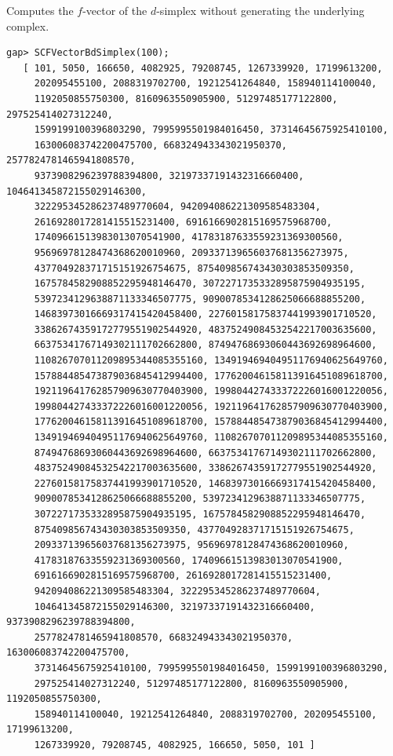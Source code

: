 \documentclass[a4paper,11pt]{report}
\begin{document}
{{{ Computes the $f$-vector of the $d$-simplex without generating the underlying complex. 
\begin{Verbatim}[commandchars=!@|,fontsize=\small,frame=single,label=Example]
   gap> SCFVectorBdSimplex(100);
   [ 101, 5050, 166650, 4082925, 79208745, 1267339920, 17199613200, 
     202095455100, 2088319702700, 19212541264840, 158940114100040, 
     1192050855750300, 8160963550905900, 51297485177122800, 297525414027312240, 
     1599199100396803290, 7995995501984016450, 37314645675925410100, 
     163006083742200475700, 668324943343021950370, 2577824781465941808570, 
     9373908296239788394800, 32197337191432316660400, 104641345872155029146300, 
     322295345286237489770604, 942094086221309585483304, 
     2616928017281415515231400, 6916166902815169575968700, 
     17409661513983013070541900, 41783187633559231369300560, 
     95696978128474368620010960, 209337139656037681356273975, 
     437704928371715151926754675, 875409856743430303853509350, 
     1675784582908852295948146470, 3072271735332895875904935195, 
     5397234129638871133346507775, 9090078534128625066688855200, 
     14683973016669317415420458400, 22760158175837441993901710520, 
     33862674359172779551902544920, 48375249084532542217003635600, 
     66375341767149302111702662800, 87494768693060443692698964600, 
     110826707011209895344085355160, 134919469404951176940625649760, 
     157884485473879036845412994400, 177620046158113916451089618700, 
     192119641762857909630770403900, 199804427433372226016001220056, 
     199804427433372226016001220056, 192119641762857909630770403900, 
     177620046158113916451089618700, 157884485473879036845412994400, 
     134919469404951176940625649760, 110826707011209895344085355160, 
     87494768693060443692698964600, 66375341767149302111702662800, 
     48375249084532542217003635600, 33862674359172779551902544920, 
     22760158175837441993901710520, 14683973016669317415420458400, 
     9090078534128625066688855200, 5397234129638871133346507775, 
     3072271735332895875904935195, 1675784582908852295948146470, 
     875409856743430303853509350, 437704928371715151926754675, 
     209337139656037681356273975, 95696978128474368620010960, 
     41783187633559231369300560, 17409661513983013070541900, 
     6916166902815169575968700, 2616928017281415515231400, 
     942094086221309585483304, 322295345286237489770604, 
     104641345872155029146300, 32197337191432316660400, 9373908296239788394800, 
     2577824781465941808570, 668324943343021950370, 163006083742200475700, 
     37314645675925410100, 7995995501984016450, 1599199100396803290, 
     297525414027312240, 51297485177122800, 8160963550905900, 1192050855750300, 
     158940114100040, 19212541264840, 2088319702700, 202095455100, 17199613200, 
     1267339920, 79208745, 4082925, 166650, 5050, 101 ]
   

\end{Verbatim}}}}
\end{document}
